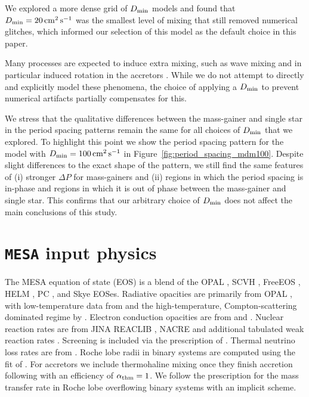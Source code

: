 \documentclass[desactivate]{aa}
\begin{document}
We explored a more dense grid of $D_{\rm min}$ models and found that $D_{\rm min} = 20 \,{\rm cm^2 \, s^{-1}}$ was the smallest level of mixing that still removed numerical glitches, which informed our selection of this model as the default choice in this paper.

Many processes are expected to induce extra mixing, such as wave mixing and in particular induced rotation in the accretors \citep{Packet+1981}. While we do not attempt to directly and explicitly model these phenomena, the choice of applying a $D_{\rm min}$ to prevent numerical artifacts partially compensates for this.

We stress that the qualitative differences between the mass-gainer and single star in the period spacing patterns remain the same for all choices of $D_{\rm min}$ that we explored. To highlight this point we show the period spacing pattern for the model with $D_{\rm min} = 100 \,{\rm cm^2 \, s^{-1}}$ in Figure~\ref{fig:period_spacing_mdm100}. Despite slight differences to the exact shape of the pattern, we still find the same features of (i) stronger $\Delta P$ for mass-gainers and (ii) regions in which the period spacing is in-phase and regions in which it is out of phase between the mass-gainer and single star. This confirms that our arbitrary choice of $D_{\rm min}$ does not affect the main conclusions of this study.

\newpage

\section{\texttt{MESA} input physics}\label{app:mesa_inputs}

The MESA equation of state (EOS) is a blend of the OPAL \citep{Rogers2002}, SCVH
\citep{Saumon1995}, FreeEOS \citep{Irwin2004}, HELM \citep{Timmes2000},
PC \citep{Potekhin2010}, and Skye \citep{Jermyn2021} EOSes. Radiative opacities are primarily from OPAL \citep{Iglesias1993, Iglesias1996}, with low-temperature data from \citet{Ferguson2005} and the high-temperature, Compton-scattering dominated regime by \citet{Poutanen2017}. Electron conduction opacities are from \citet{Cassisi2007} and \citet{Blouin2020}. Nuclear reaction rates are from JINA REACLIB \citep{Cyburt2010}, NACRE \citep{Angulo1999} and additional tabulated weak reaction rates \citep{Fuller1985, Oda1994, Langanke2000}.  Screening is included via the prescription of \citet{Chugunov2007}. Thermal neutrino loss rates are from \citet{Itoh1996}. Roche lobe radii in binary systems are computed using the fit of
\citet{Eggleton1983}. For accretors we include thermohaline mixing once they finish accretion following \citet{Kippenhahn+1980} with an efficiency of $\alpha_{\rm thm} = 1$. We follow the \citet{Kolb+1990} prescription for the mass transfer rate in Roche lobe overflowing binary systems with an implicit scheme.
\end{document}
